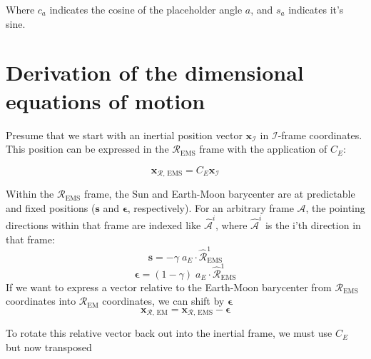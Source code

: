 \documentclass[]{article}
\begin{document}
	Where $c_a$ indicates the cosine of the placeholder angle $a$, and $s_a$ indicates it's sine.
	
	\section{Derivation of the dimensional equations of motion}
	
	
	Presume that we start with an inertial position vector $\mathbf{x}_\mathcal{I}$ in $\mathcal{I}$-frame coordinates.  This position can be expressed in the $\mathcal{R}_\text{EMS}$ frame with the application of $C_E$:
	
	\begin{equation}
		\mathbf{x}_{\mathcal{R}\text{, EMS}} = C_E \mathbf{x}_\mathcal{I}
	\end{equation}
	
	Within the $\mathcal{R}_\text{EMS}$ frame, the Sun and Earth-Moon barycenter are at predictable and fixed positions ($\mathbf{s}$ and $\boldsymbol{\epsilon}$, respectively).  For an arbitrary frame $\mathcal{A}$, the pointing directions within that frame are indexed like $\hat{\mathcal{A}}^i$, where $\hat{\mathcal{A}}^i$ is the i'th direction in that frame:
	\begin{equation}
		\mathbf{s} = -\gamma \; a_E \cdot \hat{\mathcal{R}}_\text{EMS}^1
	\end{equation}
	\begin{equation}
		\boldsymbol{\epsilon} = (1-\gamma) \; a_E \cdot \hat{\mathcal{R}}_\text{EMS}^1
	\end{equation}
	If we want to express a vector relative to the Earth-Moon barycenter from $\mathcal{R}_\text{EMS}$ coordinates into $\mathcal{R}_\text{EM}$ coordinates, we can shift by $\boldsymbol{\epsilon}$
	\begin{equation}
		\mathbf{x}_{\mathcal{R}\text{, EM}} = \mathbf{x}_{\mathcal{R}\text{, EMS}} - \boldsymbol{\epsilon}
	\end{equation}
	
	To rotate this relative vector back out into the inertial frame, we must use $C_E$ but now transposed
	
\end{document}
